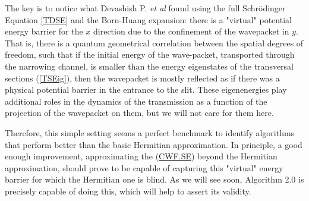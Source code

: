\documentclass[11pt, a4paper]{article} %
\begin{document}
The key is to notice what Devashish P. {\em et al} \cite{Dev} found using the full Schrödinger Equation \ref{TDSE} and the Born-Huang expansion: there is a "virtual" potential energy barrier for the $x$ direction due to the confinement of the wavepacket in $y$. That is, there is a quantum geometrical correlation between the spatial degrees of freedom, such that if the initial energy of the wave-packet, transported through the narrowing channel, is smaller than the energy eigenstates of the transversal sections (\ref{TSEig}), then the wavepacket is mostly reflected as if there was a physical potential barrier in the entrance to the slit. These eigenenergies play additional roles in the dynamics of the transmission as a function of the projection of the wavepacket on them, but we will not care for them here.

Therefore, this simple setting seems a perfect benchmark to identify algorithms that perform better than the basic Hermitian approximation. In principle, a good enough improvement, approximating the (\hyperref[CWF.SE]{CWF.SE}) beyond the Hermitian approximation, should prove to be capable of capturing this "virtual" energy barrier for which the Hermitian one is blind. As we will see soon, Algorithm 2.0 is precisely capable of doing this, which will help to assert its validity.
\end{document}
